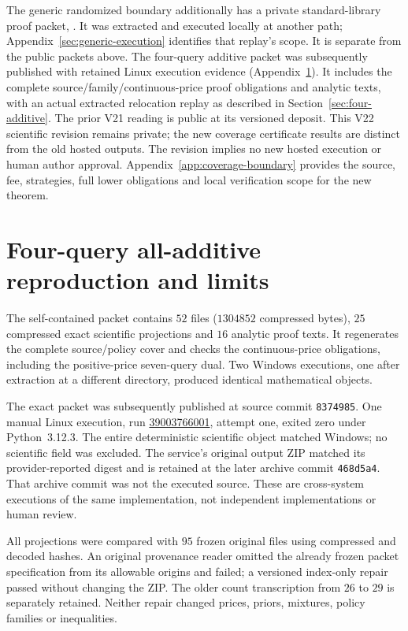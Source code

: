 \documentclass[pdflatex,sn-mathphys-num]{sn-jnl}
\theoremstyle{thmstyleone}
\theoremstyle{thmstylethree}
\theoremstyle{thmstyletwo}
\begin{document}
The generic randomized boundary additionally has a private standard-library proof packet, . It was extracted and executed locally at another path; Appendix~\ref{sec:generic-execution} identifies that replay's scope. It is separate from the public packets above. The four-query additive packet  was subsequently published with retained Linux execution evidence (Appendix~\ref{app:four-additive-replay}). It includes the complete source/family/continuous-price proof obligations and analytic texts, with an actual extracted relocation replay as described in Section~\ref{sec:four-additive}. The prior V21 reading is public at its versioned deposit. This V22
scientific revision remains private; the new coverage certificate results
are distinct from the old hosted outputs. The revision implies no new
hosted execution or human author approval. Appendix~\ref{app:coverage-boundary}
provides the source, fee, strategies, full lower obligations and local
verification scope for the new theorem.

\section{Four-query all-additive reproduction and limits}
\label{app:four-additive-replay}
The self-contained packet  contains $52$
files ($1304852$ compressed bytes), $25$ compressed exact scientific
projections and $16$ analytic proof texts. It regenerates the complete
source/policy cover and checks the continuous-price obligations, including
the positive-price seven-query dual. Two Windows executions, one after
extraction at a different directory, produced identical mathematical objects.

The exact packet was subsequently published at source commit
\texttt{8374985}. One manual Linux execution, run
\href{https://github.com/SHiJiE1115/newproj/actions/runs/39003766001}{39003766001},
attempt one, exited zero under Python~3.12.3. The entire deterministic
scientific object matched Windows; no scientific field was excluded.
The service's original output ZIP matched its provider-reported digest
and is retained at the later archive commit \texttt{468d5a4}. That archive
commit was not the executed source. These are cross-system executions
of the same implementation, not independent implementations or human review.

All projections were compared with $95$ frozen original files using
compressed and decoded hashes. An original provenance reader omitted
the already frozen packet specification from its allowable origins and
failed; a versioned index-only repair passed without changing the ZIP.
The older count transcription from $26$ to $29$ is separately retained.
Neither repair changed prices, priors, mixtures, policy families or inequalities.
\end{document}
